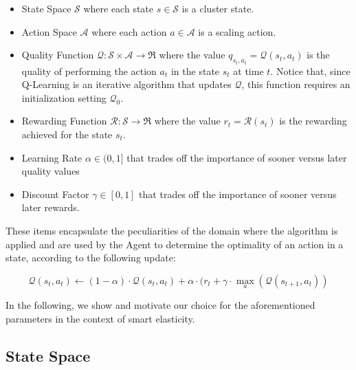 \begin{itemize}
	
	\item State Space $\mathcal{S}$ where each state $s\in\mathcal{S}$ is a cluster state.
	
	\item Action Space $\mathcal{A}$ where each action $a\in\mathcal{A}$ is a scaling action.
	
	\item Quality Function $\mathcal{Q}:\mathcal{S}\times\mathcal{A}\rightarrow\Re$ where the value $q_{s_{t},a_{t}}=\mathcal{Q}(s_{t},a_{t})$ is the quality of performing the action $a_{t}$ in the state $s_{t}$ at time $t$.
	Notice that, since Q-Learning is an iterative algorithm that updates $\mathcal{Q}$, this function requires an initialization setting $\mathcal{Q}_{0}$.
	
	\item Rewarding Function $\mathcal{R}:\mathcal{S}\rightarrow\Re$ where the value $r_{t}=\mathcal{R}(s_{t})$ is the rewarding achieved for the state $s_{t}$.
	
	\item Learning Rate $\alpha\in (0,1]$ that trades off the importance of sooner versus later quality values 
	
	\item Discount Factor $\gamma\in [0,1]$ that trades off the importance of sooner versus later rewards.
\end{itemize}

These items encapsulate the peculiarities of the domain where the algorithm is applied and are used by the Agent to determine the optimality of an action in a state, according to the following update:

\begin{equation}
	\label{eqn:smart-elasticity-reinforcement-learning-update}
	\mathcal{Q}(s_{t},a_{t}) \leftarrow (1-\alpha) \cdot \mathcal{Q}(s_{t},a_{t}) + \alpha \cdot (r_{t} + \gamma \cdot \max_{a}(\mathcal{Q}(s_{t+1},a_{t}))
\end{equation}

In the following, we show and motivate our choice for the aforementioned parameters in the context of smart elasticity.


\subsection{State Space}
\label{sec:smart-elasticity-elasticity-leveraging-q-learning-state-space}

